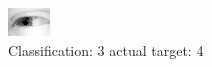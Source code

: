 \begin{figure}[h!]
\begin{center}
\includegraphics[width=0.60\columnwidth]{figures/ID2548_class_3_target_4.png}
\end{center}
\caption{ Classification: 3 actual target: 4}
\label{fig:ID2548_class_3_target_4}
\end{figure}
